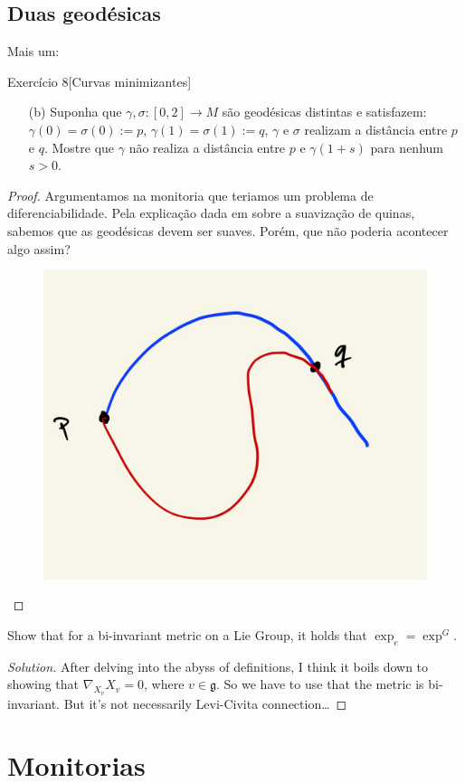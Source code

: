 \subsection{Duas geodésicas}
Mais um: 

\begin{thing4}{Exercício 8}[Curvas minimizantes]\label{exer:8}\leavevmode
\begin{enumerate}[label=(\alph*)]
	\item[(b)] Suponha que \(\gamma,\sigma:[0,2] \to M\) são geodésicas distintas e satisfazem: \(\gamma(0)=\sigma(0):=p\), \(\gamma(1)=\sigma(1):=q\), \(\gamma\) e \(\sigma\) realizam a distância entre \(p\) e \(q\). Mostre que \(\gamma\) não realiza a distância entre \(p\) e \(\gamma(1+s)\) para nenhum \(s>0\).
\end{enumerate}
\end{thing4}

\begin{proof}\leavevmode
Argumentamos na monitoria que teriamos um problema de diferenciabilidade. Pela explicação dada em  \cite{ler} sobre a suavização de quinas, sabemos que as geodésicas devem ser suaves. Porém, que não poderia acontecer algo assim?
\begin{figure}[H]
	\centering
	\includegraphics[width=.3\textwidth]{fig2}
\end{figure}
\end{proof}

\begin{exercise}\leavevmode
Show that for a bi-invariant metric on a Lie Group, it holds that \(\operatorname{exp}_e=\operatorname{exp}^G\).
\end{exercise}

\begin{proof}[Solution]\leavevmode
After delving into the abyss of definitions, I think it boils down to showing that \(\nabla_{X_v} X_v=0\), where \(v \in \mathfrak{g}\). So we have to use that the metric is bi-invariant. But it's not necessarily Levi-Civita connection…
\end{proof}

\clearpage

\section{Monitorias}

